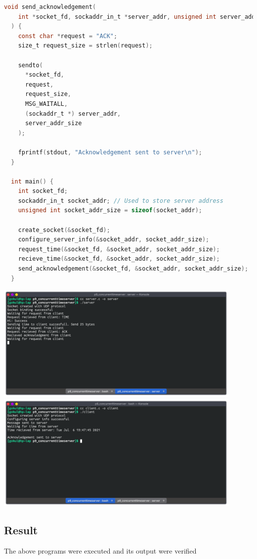 \begin{lstlisting}[language=C]
  void send_acknowledgement(
    int *socket_fd, sockaddr_in_t *server_addr, unsigned int server_addr_size
  ) {
    const char *request = "ACK";
    size_t request_size = strlen(request);
  
    sendto(
      *socket_fd,
      request,
      request_size,
      MSG_WAITALL,
      (sockaddr_t *) server_addr,
      server_addr_size
    );
  
    fprintf(stdout, "Acknowledgement sent to server\n");
  }
  
  int main() {
    int socket_fd;
    sockaddr_in_t socket_addr; // Used to store server address
    unsigned int socket_addr_size = sizeof(socket_addr);
  
    create_socket(&socket_fd);
    configure_server_info(&socket_addr, socket_addr_size);
    request_time(&socket_fd, &socket_addr, socket_addr_size);
    recieve_time(&socket_fd, &socket_addr, socket_addr_size);
    send_acknowledgement(&socket_fd, &socket_addr, socket_addr_size);
  }
\end{lstlisting}

\begin{center}
	\includegraphics[width=0.90\textwidth]{img/p10/ss1.png}
	\includegraphics[width=0.90\textwidth]{img/p10/ss2.png}
\end{center}


\subsection{Result}
The above programs were executed and its output were verified